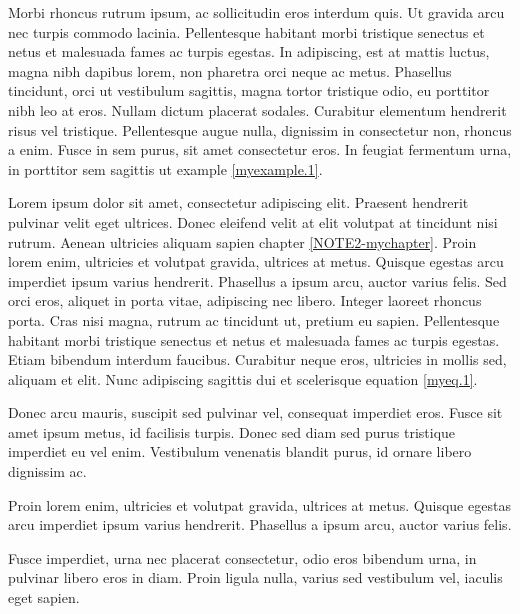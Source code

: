 \begin{case}

Morbi rhoncus rutrum ipsum, ac sollicitudin eros interdum quis. Ut gravida arcu nec turpis commodo lacinia. Pellentesque habitant morbi tristique senectus et netus et malesuada fames ac turpis egestas. In adipiscing, est at mattis luctus, magna nibh dapibus lorem, non pharetra orci neque ac metus. Phasellus tincidunt, orci ut vestibulum sagittis, magna tortor tristique odio, eu porttitor nibh leo at eros. Nullam dictum placerat sodales. Curabitur elementum hendrerit risus vel tristique. Pellentesque augue nulla, dignissim in consectetur non, rhoncus a enim. Fusce in sem purus, sit amet consectetur eros. In feugiat fermentum urna, in porttitor sem sagittis ut example \ref{myexample.1}. 

Lorem ipsum dolor sit amet, consectetur adipiscing elit. Praesent hendrerit pulvinar velit eget ultrices. Donec eleifend velit at elit volutpat at tincidunt nisi rutrum. Aenean ultricies aliquam sapien chapter \ref{NOTE2-mychapter}. Proin lorem enim, ultricies et volutpat gravida, ultrices at metus. Quisque egestas arcu imperdiet ipsum varius hendrerit. Phasellus a ipsum arcu, auctor varius felis. Sed orci eros, aliquet in porta vitae, adipiscing nec libero. Integer laoreet rhoncus porta. Cras nisi magna, rutrum ac tincidunt ut, pretium eu sapien. Pellentesque habitant morbi tristique senectus et netus et malesuada fames ac turpis egestas. Etiam bibendum interdum faucibus. Curabitur neque eros, ultricies in mollis sed, aliquam et elit. Nunc adipiscing sagittis dui et scelerisque equation \ref{myeq.1}.

\end{case}

Donec arcu mauris, suscipit sed pulvinar vel, consequat imperdiet eros. Fusce sit amet ipsum metus, id facilisis turpis. Donec sed diam sed purus tristique imperdiet eu vel enim. Vestibulum venenatis blandit purus, id ornare libero dignissim ac.

\begin{info}
Proin lorem enim, ultricies et volutpat gravida, ultrices at metus. Quisque egestas arcu imperdiet ipsum varius hendrerit. Phasellus a ipsum arcu, auctor varius felis.
\end{info}

Fusce imperdiet, urna nec placerat consectetur, odio eros bibendum urna, in pulvinar libero eros in diam. Proin ligula nulla, varius sed vestibulum vel, iaculis eget sapien.

